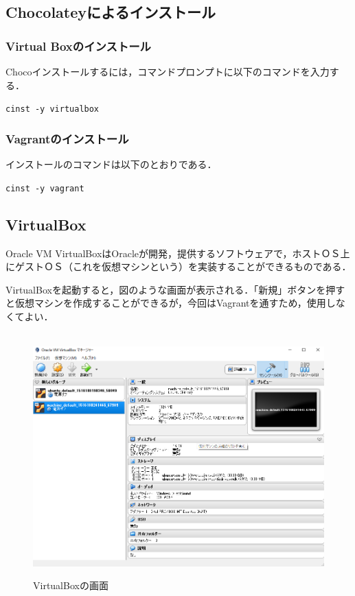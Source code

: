 \newpage

\subsection{Chocolateyによるインストール}

\subsubsection{Virtual Boxのインストール}

Chocoインストールするには，コマンドプロンプトに以下のコマンドを入力する．

\texttt{cinst -y virtualbox}


\subsubsection{Vagrantのインストール}

インストールのコマンドは以下のとおりである．

\texttt{cinst -y vagrant}

\newpage


\subsection{VirtualBox}

Oracle VM VirtualBoxはOracleが開発，提供するソフトウェアで，ホストＯＳ上にゲストＯＳ（これを仮想マシンという）を実装することができるものである．

VirtualBoxを起動すると，図のような\label{VB起動}画面が表示される．「新規」ボタンを押すと仮想マシンを作成することができるが，今回はVagrantを通すため，使用しなくてよい．

\begin{figure}[htbp]
\centering　
\includegraphics[width=13cm]{vb1.png}
\caption{VirtualBoxの画面}\label{VB起動}
\end{figure}

